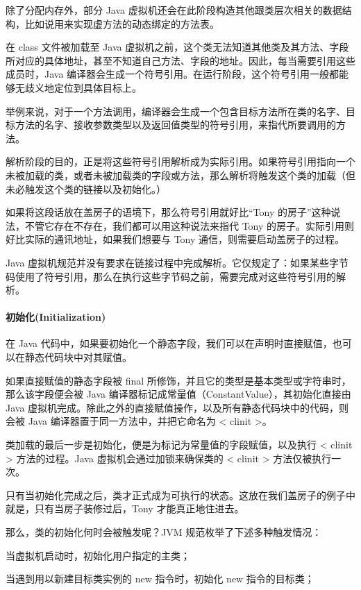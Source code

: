 \documentclass[../../../interview-questions.tex]{subfiles}
\begin{document}
除了分配内存外，部分 Java 虚拟机还会在此阶段构造其他跟类层次相关的数据结构，比如说用来实现虚方法的动态绑定的方法表。

在 class 文件被加载至 Java 虚拟机之前，这个类无法知道其他类及其方法、字段所对应的具体地址，甚至不知道自己方法、字段的地址。因此，每当需要引用这些成员时，Java 编译器会生成一个符号引用。在运行阶段，这个符号引用一般都能够无歧义地定位到具体目标上。

举例来说，对于一个方法调用，编译器会生成一个包含目标方法所在类的名字、目标方法的名字、接收参数类型以及返回值类型的符号引用，来指代所要调用的方法。

解析阶段的目的，正是将这些符号引用解析成为实际引用。如果符号引用指向一个未被加载的类，或者未被加载类的字段或方法，那么解析将触发这个类的加载（但未必触发这个类的链接以及初始化。）

如果将这段话放在盖房子的语境下，那么符号引用就好比“Tony 的房子”这种说法，不管它存在不存在，我们都可以用这种说法来指代 Tony 的房子。实际引用则好比实际的通讯地址，如果我们想要与 Tony 通信，则需要启动盖房子的过程。

Java 虚拟机规范并没有要求在链接过程中完成解析。它仅规定了：如果某些字节码使用了符号引用，那么在执行这些字节码之前，需要完成对这些符号引用的解析。

\paragraph{初始化(Initialization)}

在 Java 代码中，如果要初始化一个静态字段，我们可以在声明时直接赋值，也可以在静态代码块中对其赋值。

如果直接赋值的静态字段被 final 所修饰，并且它的类型是基本类型或字符串时，那么该字段便会被 Java 编译器标记成常量值（ConstantValue），其初始化直接由 Java 虚拟机完成。除此之外的直接赋值操作，以及所有静态代码块中的代码，则会被 Java 编译器置于同一方法中，并把它命名为 < clinit >。

类加载的最后一步是初始化，便是为标记为常量值的字段赋值，以及执行 < clinit > 方法的过程。Java 虚拟机会通过加锁来确保类的 < clinit > 方法仅被执行一次。

只有当初始化完成之后，类才正式成为可执行的状态。这放在我们盖房子的例子中就是，只有当房子装修过后，Tony 才能真正地住进去。

那么，类的初始化何时会被触发呢？JVM 规范枚举了下述多种触发情况：

当虚拟机启动时，初始化用户指定的主类；

当遇到用以新建目标类实例的 new 指令时，初始化 new 指令的目标类；
\end{document}
